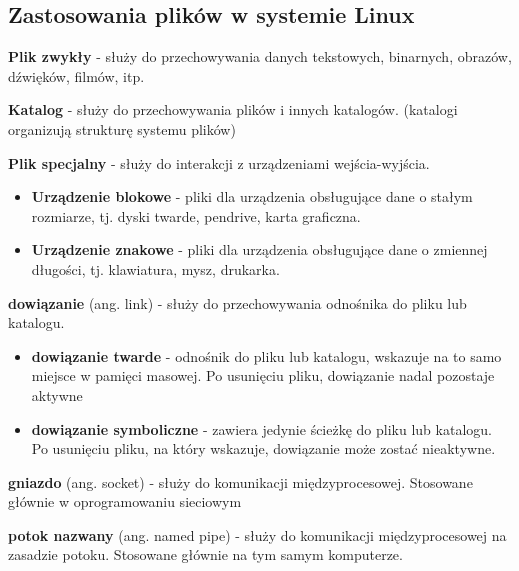 \documentclass{article}
\begin{document}
\newpage\subsection{Zastosowania plików w systemie Linux}
\textbf{Plik zwykły} - służy do przechowywania danych tekstowych, binarnych, obrazów, dźwięków, filmów, itp.

\textbf{Katalog} - służy do przechowywania plików i innych katalogów. (katalogi organizują strukturę systemu plików)

\textbf{Plik specjalny} - służy do interakcji z urządzeniami wejścia-wyjścia.
\begin{itemize}
    \item \textbf{Urządzenie blokowe} - pliki dla urządzenia obsługujące dane o stałym rozmiarze, tj. dyski twarde, pendrive, karta graficzna.
    \item \textbf{Urządzenie znakowe} - pliki dla urządzenia obsługujące dane o zmiennej długości, tj. klawiatura, mysz, drukarka.
\end{itemize}

\textbf{dowiązanie} (ang. link) - służy do przechowywania odnośnika do pliku lub katalogu.
\begin{itemize}
    \item \textbf{dowiązanie twarde} - odnośnik do pliku lub katalogu, wskazuje na to samo miejsce w pamięci masowej. Po usunięciu pliku, dowiązanie nadal pozostaje aktywne
    \item \textbf{dowiązanie symboliczne} - zawiera jedynie ścieżkę do pliku lub katalogu. Po usunięciu pliku, na który wskazuje, dowiązanie może zostać nieaktywne.
\end{itemize}

\textbf{gniazdo} (ang. socket) - służy do komunikacji międzyprocesowej. Stosowane głównie w oprogramowaniu sieciowym 

\textbf{potok nazwany} (ang. named pipe) - służy do komunikacji międzyprocesowej na zasadzie potoku. Stosowane głównie na tym samym komputerze.
\end{document}
